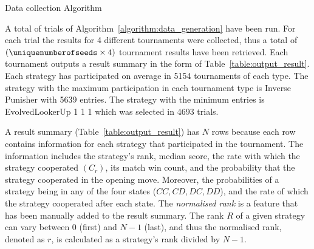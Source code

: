 \begin{algorithm}[!htbp]
    \;
    \caption{Data collection Algorithm}
    \label{algorithm:data_generation}
\end{algorithm}

A total of \uniquenumberofseeds trials of Algorithm~\ref{algorithm:data_generation} have been
run. For each trial the results for 4 different tournaments were collected,
thus a total of \numberofalltournaments $(\uniquenumberofseeds \times 4)$ tournament results have been
retrieved. Each tournament outputs a result summary in the form of
Table~\ref{table:output_result}. Each strategy has participated on average in
5154 tournaments of each type. The strategy with the maximum participation in each
tournament type is Inverse Punisher with 5639 entries. The strategy with the
minimum entries is EvolvedLookerUp 1 1 1 which was selected in 4693 trials.

A result summary (Table~\ref{table:output_result}) has \(N\) rows
because each row contains information for each strategy that participated in the
tournament. The information includes the strategy's rank, median score, the rate
with which the strategy cooperated $(C_r)$, its match win count, and the
probability that the strategy cooperated in the opening move. Moreover, the
probabilities of a strategy being in any of the four states ($CC, CD, DC, DD$),
and the rate of which the strategy cooperated after each state. The \textit{normalised rank}
is a feature that has been manually added to the result summary. The rank \(R\) of a given
strategy can vary between 0 (first) and \(N-1\) (last), and thus the normalised rank,
denoted as $r$, is calculated as a strategy's rank divided by \(N - 1\).

